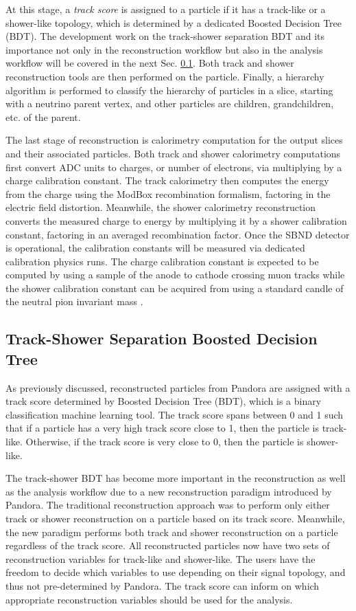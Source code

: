 At this stage, a \textit{track score} is assigned to a particle if it has a track-like or a shower-like topology, which is determined by a dedicated Boosted Decision Tree (BDT).
The development work on the track-shower separation BDT and its importance not only in the reconstruction workflow but also in the analysis workflow will be covered in the next Sec. \ref{sec:trkshwbdt}.
Both track and shower reconstruction tools are then performed on the particle. 
Finally, a hierarchy algorithm is performed to classify the hierarchy of particles in a slice, starting with a neutrino parent vertex, and other particles are children, grandchildren, etc. of the parent.                             

The last stage of reconstruction is calorimetry computation for the output slices and their associated particles.
Both track and shower calorimetry computations first convert ADC units to charges, or number of electrons, via multiplying by a charge calibration constant.
The track calorimetry then computes the energy from the charge using the ModBox recombination formalism, factoring in the electric field distortion.
Meanwhile, the shower calorimetry reconstruction converts the measured charge to energy by multiplying it by a shower calibration constant, factoring in an averaged recombination factor. 
Once the SBND detector is operational, the calibration constants will be measured via dedicated calibration physics runs.
The charge calibration constant is expected to be computed by using a sample of the anode to cathode crossing muon tracks while the shower calibration constant can be acquired from using a standard candle of the neutral pion invariant mass \cite{uboone_gamma}.

\subsection{Track-Shower Separation Boosted Decision Tree}
\label{sec:trkshwbdt}
As previously discussed, reconstructed particles from Pandora are assigned with a track score determined by Boosted Decision Tree (BDT), which is a binary classification machine learning tool.
The track score spans between 0 and 1 such that if a particle has a very high track score close to 1, then the particle is track-like.
Otherwise, if the track score is very close to 0, then the particle is shower-like.

The track-shower BDT has become more important in the reconstruction as well as the analysis workflow due to a new reconstruction paradigm introduced by Pandora.
The traditional reconstruction approach was to perform only either track or shower reconstruction on a particle based on its track score.
Meanwhile, the new paradigm performs both track and shower reconstruction on a particle regardless of the track score.
All reconstructed particles now have two sets of reconstruction variables for track-like and shower-like.
The users have the freedom to decide which variables to use depending on their signal topology, and thus not pre-determined by Pandora.
The track score can inform on which appropriate reconstruction variables should be used for the analysis. 

